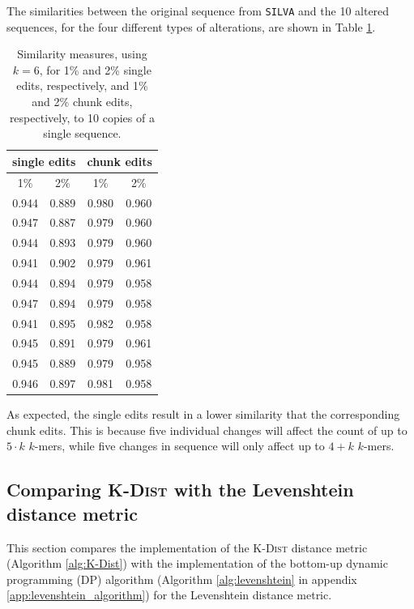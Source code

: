 The similarities between the original sequence from \texttt{SILVA} and the 10
altered sequences, for the four different types of alterations, are shown in
Table \ref{tab:altered_seqs_similarities}.

\begin{table}[H]
  \centering
  \begin{tabular}{c|c||c|c}
    \multicolumn{2}{c||}{single edits}  & \multicolumn{2}{c}{chunk edits} \\
    \hline\hline
    1\%   &   2\%                   &   1\%   &   2\% \\
    \hline
    0.944   & 0.889                     & 0.980     & 0.960 \\
    0.947   & 0.887                     & 0.979     & 0.960 \\
    0.944   & 0.893                     & 0.979     & 0.960 \\
    0.941   & 0.902                     & 0.979     & 0.961 \\
    0.944   & 0.894                     & 0.979     & 0.958 \\
    0.947   & 0.894                     & 0.979     & 0.958 \\
    0.941   & 0.895                     & 0.982     & 0.958 \\
    0.945   & 0.891                     & 0.979     & 0.961 \\
    0.945   & 0.889                     & 0.979     & 0.958 \\
    0.946   & 0.897                     & 0.981     & 0.958
  \end{tabular}
  \caption{Similarity measures, using $k=6$, for 1\% and 2\% single edits, respectively,
    and 1\% and 2\% chunk edits, respectively, to 10 copies of a single
    sequence.}
  \label{tab:altered_seqs_similarities}
\end{table}

As expected, the single edits result in a lower similarity that the
corresponding chunk edits. This is because five individual changes will affect
the count of up to $5 \cdot k$ $k$-mers, while five changes in sequence will
only affect up to $4+k$ $k$-mers.


\subsection{Comparing \textsc{K-Dist} with the Levenshtein distance metric}

This section compares the implementation of the \textsc{K-Dist} distance metric
(Algorithm \ref{alg:K-Dist}) with the implementation of the bottom-up dynamic
programming (DP) algorithm (Algorithm \ref{alg:levenshtein} in appendix
\ref{app:levenshtein_algorithm}) for the Levenshtein distance metric.

